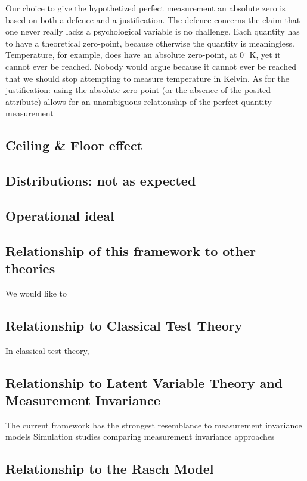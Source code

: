 \documentclass[utf8]{FrontiersinVancouver}
\begin{document}
Our choice to give the hypothetized perfect measurement an absolute zero is based on both a defence and a justification. The defence concerns the claim that one never really lacks a psychological variable is no challenge. Each quantity has to have a theoretical zero-point, because otherwise the quantity is meaningless. Temperature, for example, does have an absolute zero-point, at 0$^\circ$ K, yet it cannot ever be reached. Nobody would argue because it cannot ever be reached that we should stop attempting to measure temperature in Kelvin. As for the justification: using the absolute zero-point (or the absence of the posited attribute) allows for an unambiguous relationship of the perfect quantity measurement 

\subsection{Ceiling & Floor effect}

\subsection{Distributions: not as expected}

\subsection{Operational ideal}

\subsection{Relationship of this framework to other theories}
We would like to 
\subsection{Relationship to Classical Test Theory}
In classical test theory, 

\subsection{Relationship to Latent Variable Theory and Measurement Invariance}
The current framework has the strongest resemblance to measurement invariance models 
Simulation studies comparing measurement invariance approaches 

\subsection{Relationship to the Rasch Model}
\end{document}
